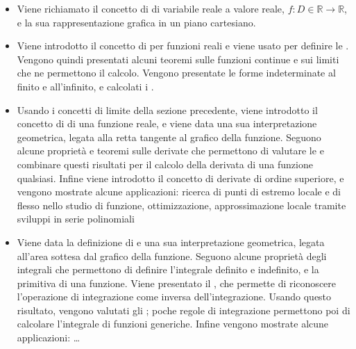\documentclass[letterpaper,10pt,english]{jupyterBook}
\begin{document}
\begin{itemize}
\item {} 
\sphinxAtStartPar
Viene richiamato il concetto di  di variabile reale a valore reale, \(f: D \in \mathbb{R} \rightarrow \mathbb{R}\), e la sua rappresentazione grafica in un piano cartesiano.

\item {} 
\sphinxAtStartPar
Viene introdotto il concetto di  per funzioni reali e viene usato per definire le . Vengono quindi presentati alcuni teoremi sulle funzioni continue e sui limiti che ne permettono il calcolo. Vengono presentate le forme indeterminate al finito e all’infinito, e calcolati i .

\item {} 
\sphinxAtStartPar
Usando i concetti di limite della sezione precedente, viene introdotto il concetto di  di una funzione reale, e viene data una sua interpretazione geometrica, legata alla retta tangente al grafico della funzione. Seguono alcune proprietà e teoremi sulle derivate che permettono di valutare le  e combinare questi risultati per il calcolo della derivata di una funzione qualsiasi. Infine viene introdotto il concetto di derivate di ordine superiore, e vengono mostrate alcune applicazioni: ricerca di punti di estremo locale e di flesso nello studio di funzione, ottimizzazione, approssimazione locale tramite sviluppi in serie polinomiali

\item {} 
\sphinxAtStartPar
Viene data la definizione di  e una sua interpretazione geometrica, legata all’area sottesa dal grafico della funzione. Seguono alcune proprietà degli integrali che permettono di definire l’integrale definito e indefinito, e la primitiva di una funzione. Viene presentato il , che permette di riconoscere l’operazione di integrazione come inversa dell’integrazione. Usando questo risultato, vengono valutati gli ; poche regole di integrazione permettono poi di calcolare l’integrale di funzioni generiche. Infine vengono mostrate alcune applicazioni: … 

\end{itemize}
\end{document}
